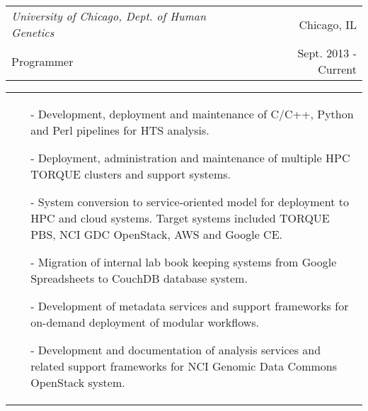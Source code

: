 \begin{tabularx}{\textwidth}{ L R }
  \textit{University of Chicago, Dept. of Human Genetics} & Chicago, IL \\
  Programmer & Sept. 2013 - Current \\
\end{tabularx}
\begin{tabularx}{\textwidth}{ X }
  \begin{small}
  \begin{itemize}
    \itemsep{}
    \item[-] Development, deployment and maintenance of C/C++, Python and Perl pipelines for HTS analysis.
    \item[-] Deployment, administration and maintenance of multiple HPC TORQUE clusters and support systems.
    \item[-] System conversion to service-oriented model for deployment to HPC and cloud systems. Target systems included TORQUE PBS, NCI GDC OpenStack, AWS and Google CE.
    \item[-] Migration of internal lab book keeping systems from Google Spreadsheets to CouchDB database system.
    \item[-] Development of metadata services and support frameworks for on-demand deployment of modular workflows.
    \item[-] Development and documentation of analysis services and related support frameworks for NCI Genomic Data Commons OpenStack system.
  \end{itemize}
  \end{small}
\end{tabularx}

